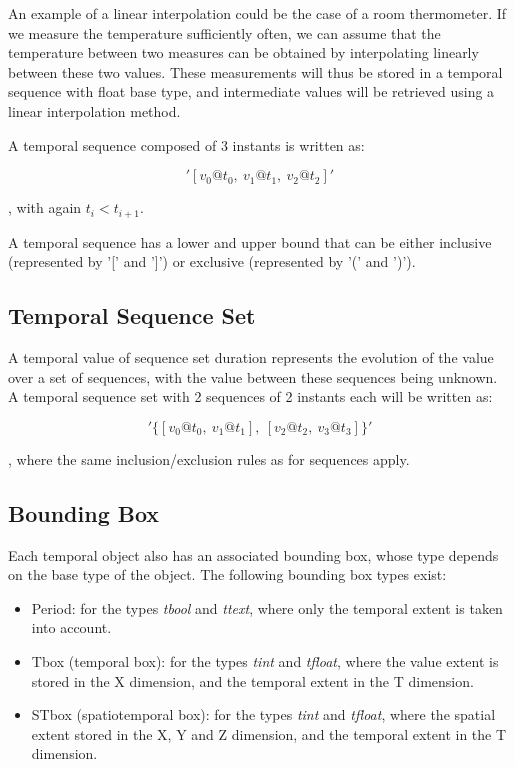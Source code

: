 An example of a linear interpolation could be the case of a room thermometer. If we measure the temperature sufficiently often, we can assume that the temperature between two measures can be obtained by interpolating linearly between these two values. These measurements will thus be stored in a temporal sequence with float base type, and intermediate values will be retrieved using a linear interpolation method.

A temporal sequence composed of 3 instants is written as:

\[
    '[v_0@t_0,\ v_1@t_1,\ v_2@t_2]'
\]

, with again \(t_i < t_{i+1}\).

A temporal sequence has a lower and upper bound that can be either inclusive (represented by '[' and ']') or exclusive (represented by '(' and ')').

\subsection{Temporal Sequence Set}

A temporal value of sequence set duration represents the evolution of the value over a set of sequences, with the value between these sequences being unknown. A temporal sequence set with 2 sequences of 2 instants each will be written as:

\[
    '\{[v_0@t_0,\ v_1@t_1],\ [v_2@t_2,\ v_3@t_3]\}'
\]

, where the same inclusion/exclusion rules as for sequences apply.

\subsection{Bounding Box}

Each temporal object also has an associated bounding box, whose type depends on the base type of the object. The following bounding box types exist:

\begin{itemize}
    \item Period: for the types \textit{tbool} and \textit{ttext}, where only the temporal extent is taken into account.
    \item Tbox (temporal box): for the types \textit{tint} and \textit{tfloat}, where the value extent is stored in the X dimension, and the temporal extent in the T dimension.
    \item STbox (spatiotemporal box): for the types \textit{tint} and \textit{tfloat}, where the spatial extent stored in the X, Y and Z dimension, and the temporal extent in the T dimension.
\end{itemize}

